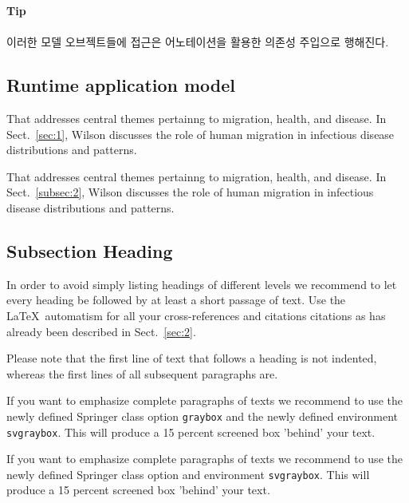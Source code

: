 \begin{svgraybox}
	\textbf{Tip} \\ \\
	이러한 모델 오브젝트들에 접근은 어노테이션을 활용한 의존성 주입으로 행해진다.
\end{svgraybox}

\subsection{Runtime application model}



\begin{description}[Type 1]
\item[Type 1]{That addresses central themes pertainng to migration, health, and disease. In Sect.~\ref{sec:1}, Wilson discusses the role of human migration in infectious disease distributions and patterns.}
\item[Type 2]{That addresses central themes pertainng to migration, health, and disease. In Sect.~\ref{subsec:2}, Wilson discusses the role of human migration in infectious disease distributions and patterns.}
\end{description}

\subsection{Subsection Heading} %
In order to avoid simply listing headings of different levels we recommend to let every heading be followed by at least a short passage of text. Use the \LaTeX\ automatism for all your cross-references and citations citations as has already been described in Sect.~\ref{sec:2}.

Please note that the first line of text that follows a heading is not indented, whereas the first lines of all subsequent paragraphs are.

\begin{svgraybox}
If you want to emphasize complete paragraphs of texts we recommend to use the newly defined Springer class option \verb|graybox| and the newly defined environment \verb|svgraybox|. This will produce a 15 percent screened box 'behind' your text.

If you want to emphasize complete paragraphs of texts we recommend to use the newly defined Springer class option and environment \verb|svgraybox|. This will produce a 15 percent screened box 'behind' your text.
\end{svgraybox}


